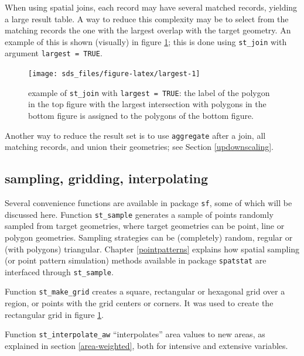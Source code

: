 \documentclass[]{book}
\begin{document}
When using spatial joins, each record may have several matched
records, yielding a large result table. A way to reduce this
complexity may be to select from the matching records the one with
the largest overlap with the target geometry. An example of this
is shown (visually) in figure \ref{fig:largest}; this is done using
\texttt{st\_join} with argument \texttt{largest\ =\ TRUE}.



\begin{figure}

{\centering \texttt{[image: sds\_files/figure-latex/largest-1]} 

}

\caption{example of \texttt{st\_join} with \texttt{largest\ =\ TRUE}: the label of the polygon in the top figure with the largest intersection with polygons in the bottom figure is assigned to the polygons of the bottom figure.}\label{fig:largest}
\end{figure}

Another way to reduce the result set is to use \texttt{aggregate} after a
join, all matching records, and union their geometries; see Section
\ref{updownscaling}.

\hypertarget{sampling-gridding-interpolating}{%
\subsection{sampling, gridding, interpolating}\label{sampling-gridding-interpolating}}

Several convenience functions are available in package \texttt{sf}, some
of which will be discussed here. Function \texttt{st\_sample} generates
a sample of points randomly sampled from target geometries, where
target geometries can be point, line or polygon geometries. Sampling
strategies can be (completely) random, regular or (with polygons)
triangular. Chapter \ref{pointpatterns} explains how spatial sampling
(or point pattern simulation) methods available in package \texttt{spatstat}
are interfaced through \texttt{st\_sample}.

Function \texttt{st\_make\_grid} creates a square, rectangular or hexagonal
grid over a region, or points with the grid centers or corners. It
was used to create the rectangular grid in figure \ref{fig:largest}.

Function \texttt{st\_interpolate\_aw} ``interpolates'' area values to new areas,
as explained in section \ref{area-weighted}, both for intensive
and extensive variables.
\end{document}
